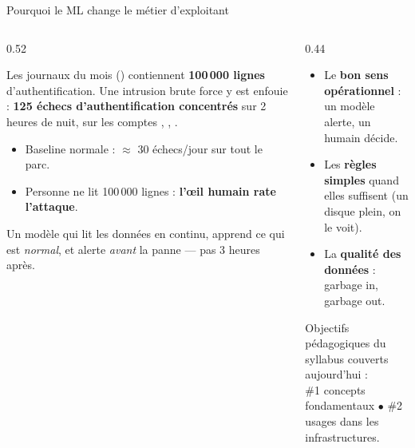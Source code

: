 \begin{frame}{Pourquoi le ML change le métier d'exploitant}
\footnotesize%
\begin{columns}[t]
\begin{column}{0.52\textwidth}
\begin{ebox}
Les journaux du mois () contiennent \textbf{100\,000 lignes}
d'authentification. Une intrusion brute force y est enfouie :
\textbf{125 échecs d'authentification concentrés} sur 2 heures de nuit,
sur les comptes , , .
\begin{itemize}
\item Baseline normale : $\approx$ 30 échecs/jour sur tout le parc.
\item Personne ne lit 100\,000 lignes : \textbf{l'œil humain rate l'attaque}.
\end{itemize}
\end{ebox}
\begin{kbox}
Un modèle qui lit les données en continu, apprend ce qui est \emph{normal},
et alerte \emph{avant} la panne --- pas 3 heures après.
\end{kbox}
\end{column}
\begin{column}{0.44\textwidth}
\begin{wbox}
\begin{itemize}
\item Le \textbf{bon sens opérationnel} : un modèle alerte, un humain décide.
\item Les \textbf{règles simples} quand elles suffisent (un disque plein, on le voit).
\item La \textbf{qualité des données} : garbage in, garbage out.
\end{itemize}
\end{wbox}
\vspace{2mm}
\begin{center}\small
Objectifs pédagogiques du syllabus couverts aujourd'hui :\\
\#1 concepts fondamentaux $\bullet$ \#2 usages dans les infrastructures.
\end{center}
\end{column}
\end{columns}
\end{frame}

